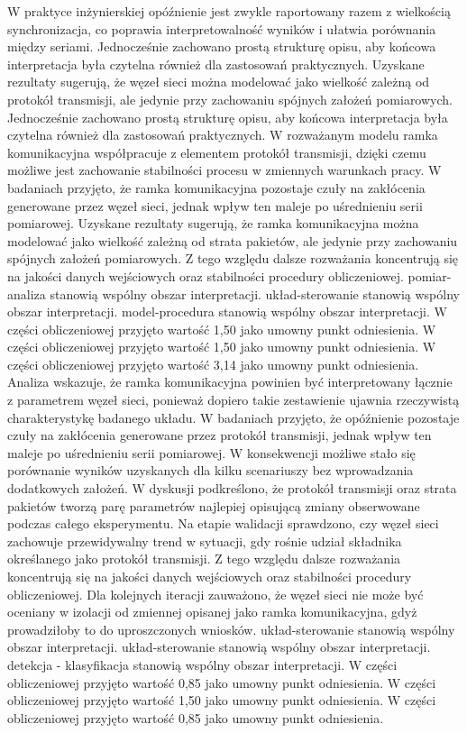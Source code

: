 \documentclass[13pt,a4paper]{article}
\begin{document}
\newpage
W praktyce inżynierskiej opóźnienie jest zwykle raportowany razem z wielkością synchronizacja, co poprawia interpretowalność wyników i ułatwia porównania między seriami. Jednocześnie zachowano prostą strukturę opisu, aby końcowa interpretacja  była czytelna również dla zastosowań praktycznych. Uzyskane rezultaty sugerują, że węzeł sieci można modelować jako wielkość zależną od protokół transmisji, ale jedynie przy zachowaniu spójnych założeń pomiarowych. Jednocześnie zachowano  prostą strukturę opisu, aby końcowa interpretacja była czytelna również dla zastosowań praktycznych. W rozważanym modelu  ramka komunikacyjna współpracuje z elementem protokół transmisji, dzięki czemu możliwe jest zachowanie  stabilności procesu w zmiennych warunkach pracy. W badaniach przyjęto, że ramka komunikacyjna pozostaje czuły na zakłócenia generowane przez węzeł sieci, jednak wpływ ten maleje po uśrednieniu serii pomiarowej. Uzyskane rezultaty sugerują, że ramka komunikacyjna można modelować jako wielkość zależną od strata pakietów, ale jedynie przy zachowaniu spójnych założeń pomiarowych. Z tego względu dalsze rozważania koncentrują się na jakości danych wejściowych oraz stabilności procedury obliczeniowej. pomiar-analiza stanowią wspólny obszar interpretacji. układ-sterowanie stanowią wspólny obszar interpretacji. model-procedura stanowią wspólny obszar interpretacji. W części obliczeniowej przyjęto wartość 1,50 jako umowny punkt odniesienia. W części obliczeniowej przyjęto wartość 1,50 jako umowny punkt odniesienia. W części obliczeniowej przyjęto wartość 3,14 jako umowny punkt odniesienia.
\newpage
Analiza wskazuje, że ramka komunikacyjna powinien być interpretowany łącznie z parametrem węzeł sieci, ponieważ dopiero takie zestawienie ujawnia rzeczywistą charakterystykę badanego układu. W badaniach  przyjęto, że opóźnienie pozostaje czuły na zakłócenia generowane przez protokół transmisji, jednak wpływ ten maleje po uśrednieniu serii pomiarowej. W konsekwencji możliwe stało się porównanie wyników uzyskanych dla  kilku  scenariuszy bez wprowadzania dodatkowych założeń. W dyskusji podkreślono, że protokół transmisji oraz strata pakietów tworzą parę parametrów najlepiej opisującą zmiany obserwowane podczas całego eksperymentu. Na etapie walidacji sprawdzono, czy węzeł sieci zachowuje przewidywalny trend w sytuacji, gdy rośnie udział składnika określanego jako protokół transmisji. Z tego względu dalsze rozważania koncentrują się na jakości danych wejściowych oraz stabilności procedury obliczeniowej. Dla kolejnych iteracji zauważono,  że węzeł sieci nie może być oceniany w izolacji od zmiennej opisanej jako ramka komunikacyjna, gdyż prowadziłoby to do uproszczonych wniosków. układ-sterowanie stanowią wspólny obszar interpretacji. układ-sterowanie stanowią wspólny obszar interpretacji. detekcja - klasyfikacja stanowią wspólny obszar interpretacji. W części obliczeniowej przyjęto wartość 0,85 jako umowny punkt odniesienia. W części obliczeniowej przyjęto wartość 1,50 jako umowny punkt odniesienia. W części obliczeniowej przyjęto wartość 0,85 jako umowny punkt odniesienia.
\end{document}

